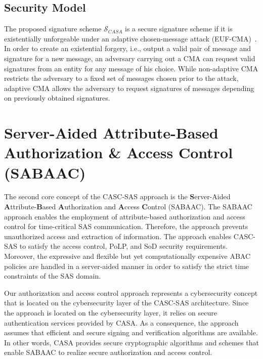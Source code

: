 \subsection{Security Model}
The proposed signature scheme $\mathcal{S}_{CASA}$ is a secure signature scheme if it is existentially unforgeable under an adaptive chosen-message attack (EUF-CMA)~\cite{Boneh2023, Goldwasser1988}.
In order to create an existential forgery, i.e., output a valid pair of message and signature for a new message, an adversary carrying out a CMA can request valid signatures from an entity for any message of his choice.
While non-adaptive CMA restricts the adversary to a fixed set of messages chosen prior to the attack, adaptive CMA allows the adversary to request signatures of messages depending on previously obtained signatures.

\section{Server-Aided Attribute-Based Authorization \& Access Control (SABAAC)}
\label{sec:approach:sabaac}
The second core concept of the CASC-SAS approach is the \textbf{S}erver-Aided \textbf{A}ttribute-\textbf{B}ased \textbf{A}uthorization and \textbf{A}ccess \textbf{C}ontrol (SABAAC).
The SABAAC approach enables the employment of attribute-based authorization and access control for time-critical SAS communication.
Therefore, the approach prevents unauthorized access and extraction of information.
The approach enables CASC-SAS to satisfy the access control, PoLP, and SoD security requirements.
Moreover, the expressive and flexible but yet computationally expensive ABAC policies are handled in a server-aided manner in order to satisfy the strict time constraints of the SAS domain.

Our authorization and access control approach represents a cybersecurity concept that is located on the cybersecurity layer of the CASC-SAS architecture.
Since the approach is located on the cybersecurity layer, it relies on secure authentication services provided by CASA.
As a consequence, the approach assumes that efficient and secure signing and verification algorithms are available.
In other words, CASA provides secure cryptographic algorithms and schemes that enable SABAAC to realize secure authorization and access control.

